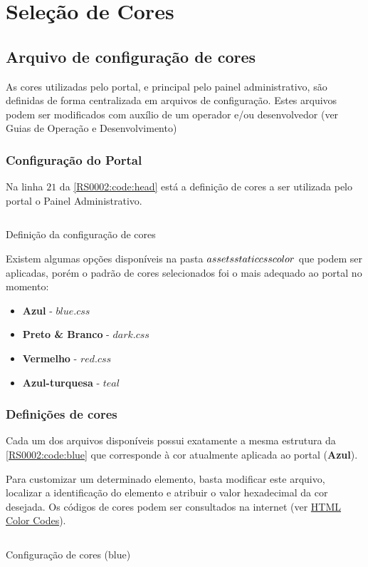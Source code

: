 \section{Seleção de Cores}\label{RS0002:colors}

\subsection{Arquivo de configuração de cores}

As cores utilizadas pelo portal, e principal pelo painel administrativo, são definidas de forma centralizada em arquivos de configuração. Estes arquivos podem ser modificados com auxílio de um operador e/ou desenvolvedor (ver Guias de Operação e Desenvolvimento)

\subsubsection{Configuração do Portal}

Na linha $21$ da \cref{RS0002:code:head} está a definição de cores a ser utilizada pelo portal o Painel Administrativo.

\begin{code}
    \inputminted[label=head.handlebars]{html}{../RS0002/anexos/head.handlebars}
    \caption{Definição da configuração de cores}\label{RS0002:code:head}
\end{code}

Existem algumas opções disponíveis na pasta $\\assets\\static\\css\\color$ que podem ser aplicadas, porém o padrão de cores selecionados foi o mais adequado ao portal no momento:

\begin{itemize}
    \item \textbf{Azul} - $blue.css$
    \item \textbf{Preto \& Branco} - $dark.css$
    \item \textbf{Vermelho} - $red.css$
    \item \textbf{Azul-turquesa} - $teal$
\end{itemize}


\subsubsection{Definições de cores}

Cada um dos arquivos disponíveis possui exatamente a mesma estrutura da \cref{RS0002:code:blue} que corresponde à cor atualmente aplicada ao portal (\textbf{Azul}).

Para customizar um determinado elemento, basta modificar este arquivo, localizar a identificação do elemento e atribuir o valor hexadecimal da cor desejada. Os códigos de cores podem ser consultados na internet (ver \href{https://html-color.codes}{HTML Color Codes}).

\begin{code}
    \inputminted[label=blue.css]{css}{../RS0002/anexos/blue.css}
    \caption{Configuração de cores (blue)}\label{RS0002:code:blue}
\end{code}